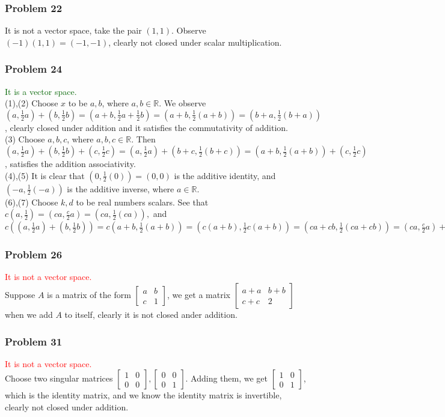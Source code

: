 \documentclass[a4paper,12pt]{article}
\begin{document}
\subsubsection*{Problem 22}
It is not a vector space, take the pair $(1,1)$. Observe $(-1)(1,1)=(-1,-1)$, clearly not closed under scalar multiplication.
\subsubsection*{Problem 24}
\textcolor{darkgreen}{It is a vector space.}\\
(1),(2) Choose $x$ to be $a,b$, where $a,b \in \mathbb{R}$. We observe $(a, \frac{1}{2}a)+(b,\frac{1}{2}b)=(a+b, \frac{1}{2}a+\frac{1}{2}b)=(a+b, \frac{1}{2}(a+b))=(b+a, \frac{1}{2}(b+a))$, clearly closed under addition and it satisfies the commutativity of addition.\\
(3) Choose $a,b,c$, where $a,b,c \in \mathbb{R}.$ Then $(a,\frac{1}{2}a)+(b,\frac{1}{2}b)+(c,\frac{1}{2}c)=(a,\frac{1}{2}a)+(b+c,\frac{1}{2}(b+c))=(a+b,\frac{1}{2}(a+b))+(c,\frac{1}{2}c)$, satisfies the addition associativity.\\
(4),(5) It is clear that $(0,\frac{1}{2} (0))=(0,0)$ is the additive identity, and $(-a,\frac{1}{2}(-a))$ is the additive inverse, where $a\in \mathbb{R}$. \\
(6),(7) Choose $k,d$ to be real numbers scalars. See that $c(a,\frac{1}{2})=(ca,\frac{c}{2}a)=(ca,\frac{1}{2}(ca)),$ and $c((a,\frac{1}{2}a)+(b,\frac{1}{2}b))=c(a+b,\frac{1}{2}(a+b))=(c(a+b),\frac{1}{2}c(a+b))=(ca+cb,\frac{1}{2}(ca+cb))=(ca,\frac{c}{2}a)+(cb,\frac{c}{2}b).$
\subsubsection*{Problem 26}
\textcolor{red}{It is not a vector space.}\\ Suppose $A$ is a matrix of the form $\begin{bmatrix}
   a& b \\
   c& 1
\end{bmatrix}$, we get a matrix $\begin{bmatrix}
  a+a & b+b \\
   c+c & 2
\end{bmatrix}$ when we add $A$ to itself, clearly it is not closed ander addition.
\subsubsection*{Problem 31}
\textcolor{red}{It is not a vector space.}\\ Choose two singular matrices $\begin{bmatrix}
  1 & 0 \\
  0 & 0
\end{bmatrix}, \begin{bmatrix}
  0 & 0 \\
  0 & 1
\end{bmatrix}$. Adding them, we get $\begin{bmatrix}
  1 & 0 \\
  0 & 1
\end{bmatrix}$, which is the identity matrix, and we know the identity matrix is invertible, clearly not closed under addition.
\end{document}
